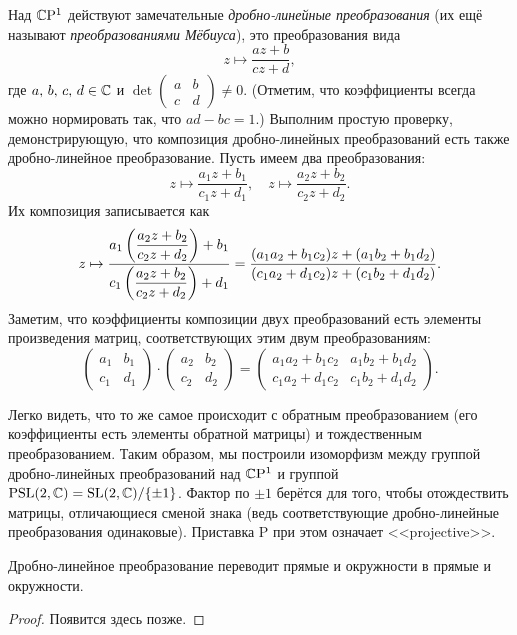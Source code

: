 Над $\mathbb{C}\mathrm{P}^1$ действуют замечательные \textit{дробно-линейные преобразования} (их ещё называют \textit{преобразованиями Мёбиуса}), это преобразования вида
\[
	z \mapsto \frac{az + b}{cz + d},
\]
где $a,\,b,\,c,\,d \in \mathbb{C}$ и
$\det\begin{pmatrix}
	a & b\\
	c & d
\end{pmatrix} \ne 0$. (Отметим, что коэффициенты всегда можно нормировать так, что $ad - bc = 1$.) Выполним простую проверку, демонстрирующую, что композиция дробно-линейных преобразований есть также дробно-линейное преобразование. Пусть имеем два преобразования:
\[
	z \mapsto \frac{a_1z + b_1}{c_1z + d_1},\quad
	z \mapsto \frac{a_2z + b_2}{c_2z + d_2}.
\]
Их композиция записывается как
\[
	z \mapsto \frac{a_1\left(\dfrac{a_2z + b_2}{c_2z + d_2}\right) + b_1}{c_1\left(\dfrac{a_2z + b_2}{c_2z + d_2}\right) + d_1} = \frac{(a_1a_2 + b_1c_2)z + (a_1b_2 + b_1d_2)}{(c_1a_2 + d_1c_2)z + (c_1b_2 + d_1d_2)}.
\]
Заметим, что коэффициенты композиции двух преобразований есть элементы произведения матриц, соответствующих этим двум преобразованиям:
\[
	\begin{pmatrix}
		a_1 & b_1\\
		c_1 & d_1
	\end{pmatrix} \cdot
	\begin{pmatrix}
		a_2 & b_2\\
		c_2 & d_2
	\end{pmatrix} =
	\begin{pmatrix}
		a_1a_2 + b_1c_2 & a_1b_2 + b_1d_2\\
		c_1a_2 + d_1c_2 & c_1b_2 + d_1d_2
	\end{pmatrix}.
\]

Легко видеть, что то же самое происходит с обратным преобразованием (его коэффициенты есть элементы обратной матрицы) и тождественным преобразованием. Таким образом, мы построили изоморфизм между группой дробно-линейных преобразований над $\mathbb{C}\mathrm{P}^1$ и группой $\mathrm{PSL}(2, \mathbb{C}) = \mathrm{SL}(2, \mathbb{C}) / \{\pm 1\}$. Фактор по $\pm 1$ берётся для того, чтобы отождествить матрицы, отличающиеся сменой знака (ведь соответствующие дробно-линейные преобразования одинаковые). Приставка $\mathrm{P}$ при этом означает <<projective>>.

\begin{proposition}
	Дробно-линейное преобразование переводит прямые и окружности в прямые и окружности.
\end{proposition}

\begin{proof}
	Появится здесь позже.
\end{proof}

